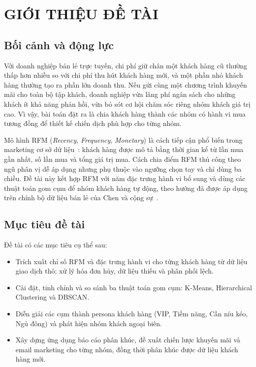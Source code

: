 \documentclass[../report.tex]{subfiles}
\begin{document}
\newpage
\section{GIỚI THIỆU ĐỀ TÀI}
\label{sec:intro}

\subsection{Bối cảnh và động lực}

Với doanh nghiệp bán lẻ trực tuyến, chi phí giữ chân một khách hàng cũ thường thấp hơn nhiều so với chi phí thu hút khách hàng mới, và một phần nhỏ khách hàng thường tạo ra phần lớn doanh thu. Nếu gửi cùng một chương trình khuyến mãi cho toàn bộ tập khách, doanh nghiệp vừa lãng phí ngân sách cho những khách ít khả năng phản hồi, vừa bỏ sót cơ hội chăm sóc riêng nhóm khách giá trị cao. Vì vậy, bài toán đặt ra là chia khách hàng thành các nhóm có hành vi mua tương đồng để thiết kế chiến dịch phù hợp cho từng nhóm.

Mô hình RFM (\emph{Recency}, \emph{Frequency}, \emph{Monetary}) là cách tiếp cận phổ biến trong marketing cơ sở dữ liệu~\cite{hughes1994}: khách hàng được mô tả bằng thời gian kể từ lần mua gần nhất, số lần mua và tổng giá trị mua. Cách chia điểm RFM thủ công theo ngũ phân vị dễ áp dụng nhưng phụ thuộc vào ngưỡng chọn tay và chỉ dùng ba chiều. Đề tài này kết hợp RFM với năm đặc trưng hành vi bổ sung và dùng các thuật toán gom cụm để nhóm khách hàng tự động, theo hướng đã được áp dụng trên chính bộ dữ liệu bán lẻ của Chen và cộng sự~\cite{chen2012rfm}.

\subsection{Mục tiêu đề tài}

Đề tài có các mục tiêu cụ thể sau:
\begin{itemize}[leftmargin=1.5em]
    \item Trích xuất chỉ số RFM và đặc trưng hành vi cho từng khách hàng từ dữ liệu giao dịch thô; xử lý hóa đơn hủy, dữ liệu thiếu và phân phối lệch.
    \item Cài đặt, tinh chỉnh và so sánh ba thuật toán gom cụm: K-Means, Hierarchical Clustering và DBSCAN.
    \item Diễn giải các cụm thành persona khách hàng (VIP, Tiềm năng, Cần níu kéo, Ngủ đông) và phát hiện nhóm khách ngoại biên.
    \item Xây dựng ứng dụng báo cáo phân khúc, đề xuất chiến lược khuyến mãi và email marketing cho từng nhóm, đồng thời phân khúc được dữ liệu khách hàng mới.
\end{itemize}
\end{document}
